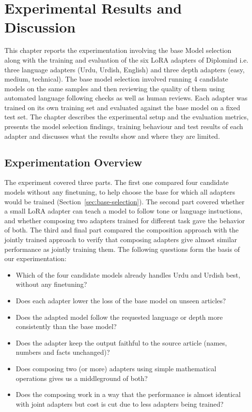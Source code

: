 \documentclass{FastFyp}
\begin{document}
\providecommand{\ph}[1]{\textbf{[#1]}}
\providecommand{\phfig}[2]{\fbox{\parbox[c][#1][c]{0.88\textwidth}{\centering\textit{#2}}}}
\chapter{Experimental Results and Discussion}
This chapter reports the experimentation involving the base Model selection along with the training and evaluation of the six LoRA adapters of Diplomind i.e. three language adapters (Urdu, Urdish, English) and three depth adapters (easy, medium, technical). The base model selection involved running 4 candidate models on the same samples and then reviewing the quality of them using automated language following checks as well as human reviews. Each adapter was trained on its own training set and evaluated against the base model on a fixed test set. The chapter describes the experimental setup and the evaluation metrics, presents the model selection findings, training behaviour and test results of each adapter and discusses what the results show and where they are limited.

\section{Experimentation Overview}
The experiment covered three parts. The first one compared four candidate models without any finetuning, to help choose the base for which all adapters would be trained (Section~\ref{sec:base-selection}). The second part covered whether a small LoRA adapter can teach a model to follow tone or language instuctions, and whether composing two adapters trained for different task gave the behavior of both. The third and final part compared the composition approach with the jointly trained approach to verify that composing adapters give almost similar performance as jointly training them. The following questions form the basis of our experimentation:
 
\begin{itemize}
    \item Which of the four candidate models already handles Urdu and Urdish best, without any finetuning?
    \item Does each adapter lower the loss of the base model on unseen articles?
    \item Does the adapted model follow the requested language or depth more consistently than the base model?
    \item Does the adapter keep the output faithful to the source article (names, numbers and facts unchanged)?
    \item Does composing two (or more) adapters using simple mathematical operations gives us a middleground of both?
    \item Does the composing work in a way that the performance is almost identical with joint adapters but cost is cut due to less adapters being trained?
\end{itemize}
 
\end{document}
